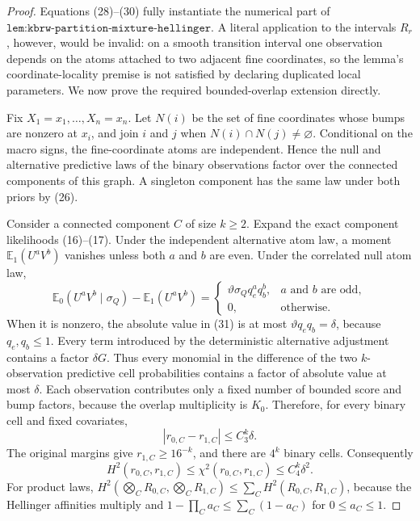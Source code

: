 \documentclass{article}
\begin{document}
\begin{proof}
Equations (28)--(30) fully instantiate the numerical part of \(\texttt{lem:kbrw-partition-mixture-hellinger}\).  A literal application to the intervals \(R_r\), however, would be invalid: on a smooth transition interval one observation depends on the atoms attached to two adjacent fine coordinates, so the lemma's coordinate-locality premise is not satisfied by declaring duplicated local parameters.  We now prove the required bounded-overlap extension directly.

Fix \(X_1=x_1,\ldots,X_n=x_n\).  Let \(N(i)\) be the set of fine coordinates whose bumps are nonzero at \(x_i\), and join \(i\) and \(j\) when \(N(i)\cap N(j)\neq\varnothing\).  Conditional on the macro signs, the fine-coordinate atoms are independent.  Hence the null and alternative predictive laws of the binary observations factor over the connected components of this graph.  A singleton component has the same law under both priors by (26).

Consider a connected component \(C\) of size \(k\geq2\).  Expand the exact component likelihoods (16)--(17).  Under the independent alternative atom law, a moment \(\mathbb E_1(U^aV^b)\) vanishes unless both \(a\) and \(b\) are even.  Under the correlated null atom law,
\[
 \mathbb E_0(U^aV^b\mid\sigma_Q)-\mathbb E_1(U^aV^b)
 =\begin{cases}
 \vartheta\sigma_Qq_e^aq_b^b,&a\text{ and }b\text{ are odd},\\
 0,&\text{otherwise}.
 \end{cases}
 \tag{31}
\]
When it is nonzero, the absolute value in (31) is at most \(\vartheta q_eq_b=\delta\), because \(q_e,q_b\leq1\).  Every term introduced by the deterministic alternative adjustment contains a factor \(\delta G\).  Thus every monomial in the difference of the two \(k\)-observation predictive cell probabilities contains a factor of absolute value at most \(\delta\).  Each observation contributes only a fixed number of bounded score and bump factors, because the overlap multiplicity is \(K_0\).  Therefore, for every binary cell and fixed covariates,
\[
 |r_{0,C}-r_{1,C}|\leq C_3^k\delta.
 \tag{32}
\]
The original margins give \(r_{1,C}\geq16^{-k}\), and there are \(4^k\) binary cells.  Consequently
\[
 H^2(r_{0,C},r_{1,C})
 \leq\chi^2(r_{0,C},r_{1,C})
 \leq C_4^k\delta^2.
 \tag{33}
\]
For product laws, \(H^2(\bigotimes_C R_{0,C},\bigotimes_C R_{1,C})\leq\sum_CH^2(R_{0,C},R_{1,C})\), because the Hellinger affinities multiply and \(1-\prod_Ca_C\leq\sum_C(1-a_C)\) for \(0\leq a_C\leq1\).


\end{proof}
\end{document}
